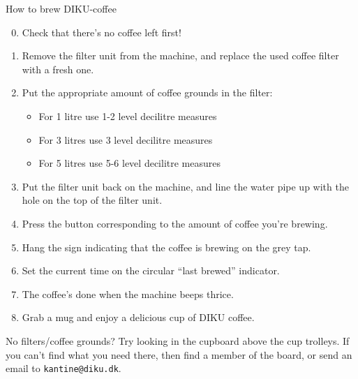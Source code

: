 \documentclass{article}
\begin{document}

\maketitle

\null
\vspace{-0.2cm}

\fontsize{18}{20}\selectfont

\vspace{-1.7cm}

\hspace{-0.9cm}\noindent How to brew DIKU-coffee

\vspace{1.5cm}

\begin{enumerate}

\setcounter{enumi}{-1}

\itemsep-0.1cm

\item Check that there's no coffee left first!

\item Remove the filter unit from the machine, and replace the used coffee
filter with a fresh one.

\item Put the appropriate amount of coffee grounds in the filter:

\begin{itemize}

\bfseries

\item For 1 litre use 1-2 level decilitre measures

\item For 3 litres use 3 level decilitre measures

\item For 5 litres use 5-6 level decilitre measures

\end{itemize}

\item Put the filter unit back on the machine, and line the water pipe up with
the hole on the top of the filter unit.

\item Press the button corresponding to the amount of coffee you're brewing.

\item Hang the sign indicating that the coffee is brewing on the grey tap.

\item Set the current time on the circular ``last brewed'' indicator.

\item The coffee's done when the machine beeps thrice.

\item Grab a mug and enjoy a delicious cup of DIKU coffee.

\end{enumerate}

\vspace{0.2cm}

\begin{center}
\LARGE

No filters/coffee grounds? Try looking in the cupboard above the cup trolleys.
If you can't find what you need there, then find a member of the board, or send
an email to \texttt{kantine@diku.dk}.

\end{center}

\underskriv
\end{document}
